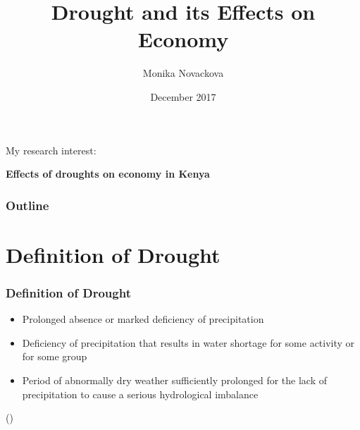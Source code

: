 \documentclass{beamer}              %
\title{Drought and its Effects on Economy}
\author{Monika Novackova}
\date{December 2017}
\institute{University of Sussex}
\begin{document}





\maketitle


\normalsize

\begin{frame}\label{My Interest}
 
\large{My research interest:} \\
\vspace{0.7cm}

\large{\hspace{1cm}\textbf{Effects of droughts on economy in Kenya}}
\end{frame}

\begin{frame}
\frametitle{Outline}
\tableofcontents
\end{frame} 



\section{Definition of Drought}



\begin{frame}\label{Definition of Drought}
\frametitle{Definition of Drought} 
 \begin{itemize}


\item Prolonged absence or marked deficiency of precipitation  
\item Deficiency of precipitation that results in water shortage for some activity
or for some group
\item Period of abnormally dry weather sufficiently prolonged for the lack of precipitation to cause a serious hydrological imbalance 
\end{itemize} 

(\citealp{heim2002,IPCCtrenberth})
\end{frame}
\end{document}
